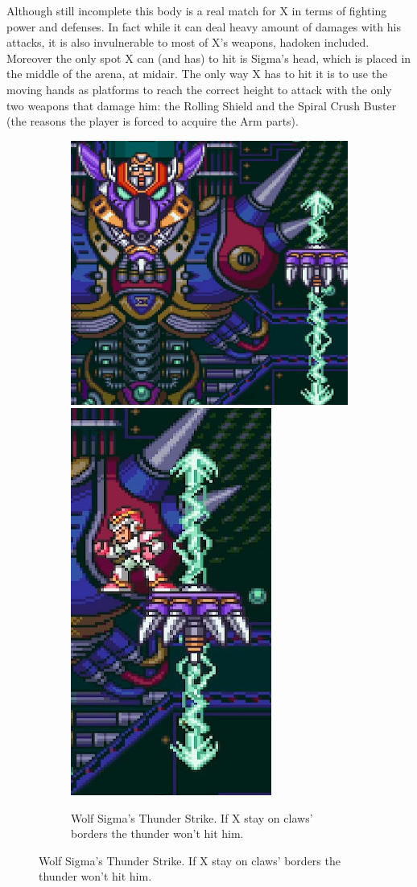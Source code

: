 Although still incomplete this body is a real match for X in terms of fighting power and defenses. In fact while it can deal heavy amount of damages with his attacks, it is also invulnerable to most of X's weapons, hadoken included. Moreover the only spot X can (and has) to hit is Sigma's head, which is placed in the middle of the arena, at midair. The only way X has to hit it is to use the moving hands as platforms to reach the correct height to attack with the only two weapons that damage him: the Rolling Shield and the Spiral Crush Buster (the reasons the player is forced to acquire the Arm parts).
\begin{figure}[htp]
	\centering
	\begin{subfigure}{0.85\linewidth}
		\centering
		\includegraphics[width=0.65\linewidth]{figures/X1/Sigma_stages/WolfSigma_thunder.jpg}
		\includegraphics[width=0.32\linewidth]{figures/X1/Sigma_stages/WolfSigma_thunder_2.jpg}
		\caption{Wolf Sigma's Thunder Strike. If X stay on claws' borders the thunder won't hit him.}

\end{subfigure}
\end{figure}
